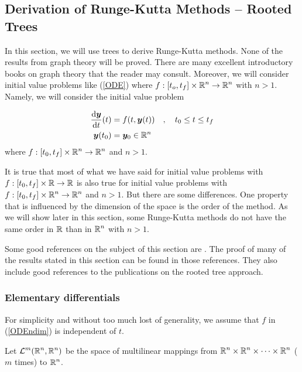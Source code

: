 \subsection{Derivation of Runge-Kutta Methods -- Rooted Trees}

In this section, we will use trees to derive Runge-Kutta methods.
None of the results from graph theory will be proved.  There are many
excellent introductory books on graph theory that the reader may consult.
Moreover, we will consider initial value problems like (\ref{ODE}) where
$\displaystyle f:[t_o,t_f]\times \mathbb{R}^n \to \mathbb{R}^n$ with $n>1$.  Namely, we will
consider the initial value problem

\begin{equation} \label{ODEndim}
\begin{split}
\frac{\mathrm{d}\bm{y}}{\mathrm{d}{t}}(t) &= f(t,\bm{y}(t)) \quad,
\quad t_0 \leq t \leq t_f \\
\bm{y}(t_0) & = \bm{y}_0 \in \mathbb{R}^n
\end{split}
\end{equation}
where $\displaystyle f:[t_0,t_f]\times\mathbb{R}^n \rightarrow \mathbb{R}^n$ and $n>1$.

It is true that most of what we have said for initial value problems
with $f:[t_0,t_f]\times \mathbb{R} \to \mathbb{R}$ is also true for initial value
problems with $\displaystyle f:[t_0,t_f]\times \mathbb{R}^n \to \mathbb{R}^n$ and
$n>1$.  But there are some differences.  One property that is influenced by the
dimension of the space is the order of the method.  As we will show
later in this section, some Runge-Kutta methods do not have the same
order in $\mathbb{R}$ than in $\displaystyle \mathbb{R}^n$ with $n>1$.

Some good references on the subject of this section are
\cite{B,I,La,Lb}.  The proof of many of the results stated in this
section can be found in those references.  They also include good
references to the publications on the rooted tree approach. 

\subsubsection{Elementary differentials}

For simplicity and without too much lost of generality, we assume that
$f$ in (\ref{ODEndim}) is independent of $t$.

Let $\displaystyle \mathcal{L}^{m}(\mathbb{R}^n,\mathbb{R}^n)$ be the space of multilinear
mappings from
$\displaystyle \mathbb{R}^n \times \mathbb{R}^n \times \cdots \times \mathbb{R}^n$ ($m$
times) to $\displaystyle \mathbb{R}^n$.

